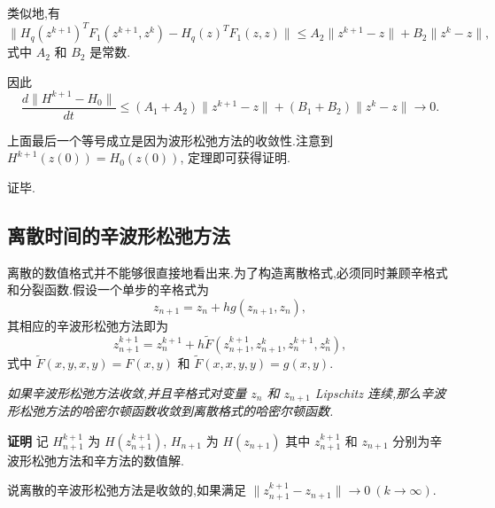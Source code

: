 类似地,有
\begin{equation*}
\|H_q(z^{k+1})^TF_1(z^{k+1},z^{k})-H_q(z)^TF_1(z,z)\|\le A_2\|z^{k+1}-z\|+B_2\|z^{k}-z\|,
\end{equation*}
式中 $A_2$ 和 $B_2$ 是常数.

因此
\begin{equation*}
\frac{d\|H^{k+1}-H_0\|}{dt}\le (A_1+A_2)\|z^{k+1}-z\|+(B_1+B_2)\|z^{k}-z\| \to 0.
\end{equation*}

上面最后一个等号成立是因为波形松弛方法的收敛性.注意到 $H^{k+1}(z(0))=H_0(z(0))$, 定理即可获得证明.

证毕.

\subsection{离散时间的辛波形松弛方法}
离散的数值格式并不能够很直接地看出来.为了构造离散格式,必须同时兼顾辛格式和分裂函数.假设一个单步的辛格式为
\begin{equation*}
z_{n+1}=z_{n}+h g(z_{n+1},z_{n}),
\end{equation*}
其相应的辛波形松弛方法即为
\begin{equation}\label{eq:discrete}
z_{n+1}^{k+1}=z_{n}^{k+1}+h \tilde{F}(z_{n+1}^{k+1},z_{n+1}^{k},z_{n}^{k+1},z_{n}^{k}),
\end{equation}
式中 $\tilde{F}(x,y,x,y)=F(x,y)$ 和 $\tilde{F}(x,x,y,y)=g(x,y)$.

\begin{theorem}
\emph{如果辛波形松弛方法收敛,并且辛格式对变量 $z_{n}$ 和 $z_{n+1}$ Lipschitz 连续,那么辛波形松弛方法的哈密尔顿函数收敛到离散格式的哈密尔顿函数.}
\end{theorem}

{\textbf{证明}} 记 $H^{k+1}_{n+1}$ 为 $H(z_{n+1}^{k+1})$, $H_{n+1}$ 为 $H(z_{n+1})$ 其中 $z_{n+1}^{k+1}$ 和 $z_{n+1}$ 分别为辛波形松弛方法和辛方法的数值解.

说离散的辛波形松弛方法是收敛的,如果满足 $\|z_{n+1}^{k+1} - z_{n+1}\| \to 0~(k \to \infty)$.

